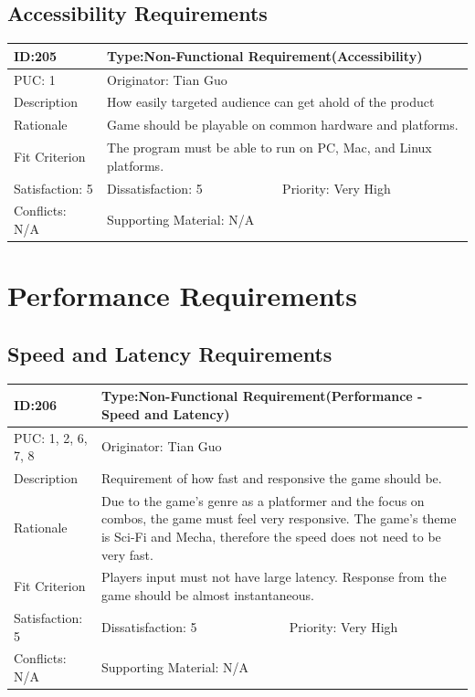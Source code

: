 \documentclass{article}
\begin{document}
	\subsection{Accessibility Requirements}
	\begin{table}[H]
		\begin{tabular}{|l|l|l|}
			\hline
			ID:205 & \multicolumn{2}{l|}{Type:Non-Functional Requirement(Accessibility)} \\ \hline
			PUC: 1 & \multicolumn{2}{l|}{Originator: Tian Guo} \\ \hline
			Description & \multicolumn{2}{m{0.85\textwidth}|}{How easily targeted audience can get ahold of the product} \\ \hline
			Rationale & \multicolumn{2}{m{0.85\textwidth}|}{Game should be playable on common hardware and platforms.} \\ \hline
			Fit Criterion & \multicolumn{2}{m{0.85\textwidth}|}{The program must be able to run on PC, Mac, and Linux platforms.} \\ \hline
			Satisfaction: 5 & Dissatisfaction: 5 & Priority: Very High \\ \hline
			Conflicts: N/A & \multicolumn{2}{l|}{Supporting Material: N/A} \\ \hline
		\end{tabular}
	\end{table}

	\section{Performance Requirements}
	\subsection{Speed and Latency Requirements}
	\begin{table}[H]
		\begin{tabular}{|l|l|l|}
			\hline
			ID:206 & \multicolumn{2}{l|}{Type:Non-Functional Requirement(Performance - Speed and Latency)} \\ \hline
			PUC: 1, 2, 6, 7, 8  & \multicolumn{2}{l|}{Originator: Tian Guo} \\ \hline
			Description & \multicolumn{2}{m{0.85\textwidth}|}{Requirement of how fast and responsive the game should be.} \\ \hline
			Rationale & \multicolumn{2}{m{0.85\textwidth}|}{Due to the game’s genre as a platformer and the focus on combos, the game must feel very responsive. The game’s theme is Sci-Fi and Mecha, therefore the speed does not need to be very fast.} \\ \hline
			Fit Criterion & \multicolumn{2}{m{0.85\textwidth}|}{Players input must not have large latency. Response from the game should be almost instantaneous.} \\ \hline
			Satisfaction: 5 & Dissatisfaction: 5 & Priority: Very High \\ \hline
			Conflicts: N/A & \multicolumn{2}{l|}{Supporting Material: N/A} \\ \hline
		\end{tabular}
	\end{table}
\end{document}
